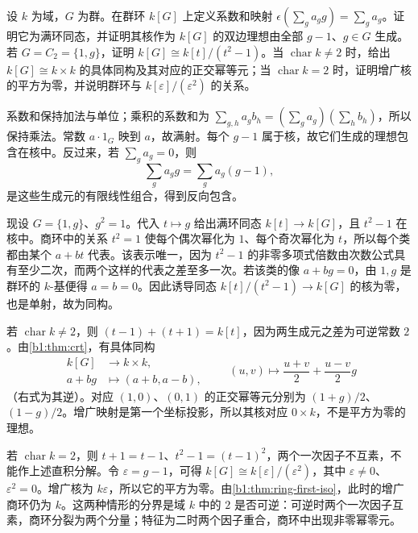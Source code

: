 \begin{exercise}\label{b1:ex:10-group-ring-augmentation}
	设 \(k\) 为域，\(G\) 为群。在群环 \(k[G]\) 上定义系数和映射 \(\epsilon(\sum_g a_gg)=\sum_g a_g\)。证明它为满环同态，并证明其核作为 \(k[G]\) 的双边理想由全部 \(g-1\)、\(g\in G\) 生成。若 \(G=C_2=\{1,g\}\)，证明 \(k[G]\cong k[t]/(t^2-1)\)。当 \(\operatorname{char}k\ne2\) 时，给出 \(k[G]\cong k\times k\) 的具体同构及其对应的正交幂等元；当 \(\operatorname{char}k=2\) 时，证明增广核的平方为零，并说明群环与 \(k[\varepsilon]/(\varepsilon^2)\) 的关系。
\end{exercise}
\begin{solution}
	系数和保持加法与单位；乘积的系数和为 \(\sum_{g,h}a_gb_h=(\sum_ga_g)(\sum_hb_h)\)，所以保持乘法。常数 \(a\cdot1_G\) 映到 \(a\)，故满射。每个 \(g-1\) 属于核，故它们生成的理想包含在核中。反过来，若 \(\sum_g a_g=0\)，则
	\[
		\sum_g a_gg=\sum_g a_g(g-1),
	\]
	是这些生成元的有限线性组合，得到反向包含。

	现设 \(G=\{1,g\}\)、\(g^2=1\)。代入 \(t\mapsto g\) 给出满环同态 \(k[t]\to k[G]\)，且 \(t^2-1\) 在核中。商环中的关系 \(t^2=1\) 使每个偶次幂化为 \(1\)、每个奇次幂化为 \(t\)，所以每个类都由某个 \(a+bt\) 代表。该表示唯一，因为 \(t^2-1\) 的非零多项式倍数由次数公式具有至少二次，而两个这样的代表之差至多一次。若该类的像 \(a+bg=0\)，由 \(1,g\) 是群环的 \(k\)-基便得 \(a=b=0\)。因此诱导同态 \(k[t]/(t^2-1)\to k[G]\) 的核为零，也是单射，故为同构。

	若 \(\operatorname{char}k\ne2\)，则 \((t-1)+(t+1)=k[t]\)，因为两生成元之差为可逆常数 \(2\)。由\cref{b1:thm:crt}，有具体同构
	\[
		\begin{aligned}
			k[G]&\longrightarrow k\times k,\\
			a+bg&\longmapsto(a+b,a-b),
		\end{aligned}
		\qquad (u,v)\longmapsto\frac{u+v}{2}+\frac{u-v}{2}g
	\]
	（右式为其逆）。对应 \((1,0)\)、\((0,1)\) 的正交幂等元分别为 \((1+g)/2\)、\((1-g)/2\)。增广映射是第一个坐标投影，所以其核对应 \(0\times k\)，不是平方为零的理想。

	若 \(\operatorname{char}k=2\)，则 \(t+1=t-1\)、\(t^2-1=(t-1)^2\)，两个一次因子不互素，不能作上述直积分解。令 \(\varepsilon=g-1\)，可得 \(k[G]\cong k[\varepsilon]/(\varepsilon^2)\)，其中 \(\varepsilon\ne0\)、\(\varepsilon^2=0\)。增广核为 \(k\varepsilon\)，所以它的平方为零。由\cref{b1:thm:ring-first-iso}，此时的增广商环仍为 \(k\)。这两种情形的分界是域 \(k\) 中的 \(2\) 是否可逆：可逆时两个一次因子互素，商环分裂为两个分量；特征为二时两个因子重合，商环中出现非零幂零元。
\end{solution}

